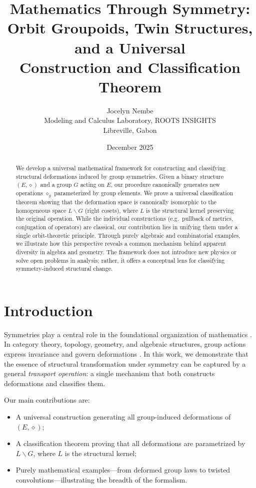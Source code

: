 \documentclass[11pt,a4paper]{article}
\title{Mathematics Through Symmetry: \\ Orbit Groupoids, Twin Structures, and a Universal \\ Construction and Classification Theorem}
\author{Jocelyn Nembe \\ Modeling and Calculus Laboratory, ROOTS INSIGHTS \\ Libreville, Gabon}
\date{December 2025}
\begin{document}
	
	\maketitle
	
	\begin{abstract}
		We develop a universal mathematical framework for constructing and classifying structural deformations induced by group symmetries. Given a binary structure $(E, \diamond)$ and a group $G$ acting on $E$, our procedure canonically generates new operations $\diamond_g$ parameterized by group elements. We prove a universal classification theorem showing that the deformation space is canonically isomorphic to the homogeneous space $L\backslash G$ (right cosets), where $L$ is the structural kernel preserving the original operation. While the individual constructions (e.g.\ pullback of metrics, conjugation of operators) are classical, our contribution lies in unifying them under a single orbit-theoretic principle. Through purely algebraic and combinatorial examples, we illustrate how this perspective reveals a common mechanism behind apparent diversity in algebra and geometry. The framework does not introduce new physics or solve open problems in analysis; rather, it offers a conceptual lens for classifying symmetry-induced structural change.
	\end{abstract}
	
	\section{Introduction}
	
	Symmetries play a central role in the foundational organization of mathematics \cite{Klein1872,Ehresmann1950}. In category theory, topology, geometry, and algebraic structures, group actions express invariance and govern deformations \cite{Bourbaki,MacLane}. In this work, we demonstrate that the essence of structural transformation under symmetry can be captured by a general \emph{transport operation}: a single mechanism that both constructs deformations and classifies them.
	
	Our main contributions are:
	\begin{itemize}
		\item A universal construction generating all group-induced deformations of $(E,\diamond)$;
		\item A classification theorem proving that all deformations are parametrized by $L\backslash G$, where $L$ is the structural kernel;
		\item Purely mathematical examples—from deformed group laws to twisted convolutions—illustrating the breadth of the formalism.
	\end{itemize}
	
\end{document}
